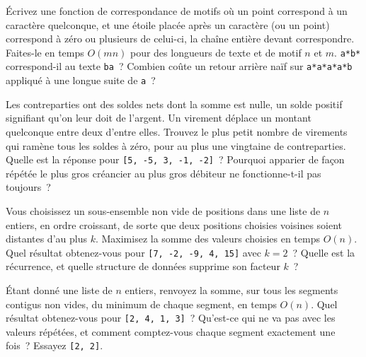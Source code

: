 \begin{question}\label{iq:iv3:algorithms:76}
Écrivez une fonction de correspondance de motifs où un point correspond à un caractère quelconque, et une étoile placée après un caractère (ou un point) correspond à zéro ou plusieurs de celui-ci, la chaîne entière devant correspondre. Faites-le en temps $O(mn)$ pour des longueurs de texte et de motif $n$ et $m$. \texttt{a*b*} correspond-il au texte \texttt{ba}~? Combien coûte un retour arrière naïf sur \texttt{a*a*a*a*b} appliqué à une longue suite de \texttt{a}~?
\end{question}

\begin{question}\label{iq:iv3:algorithms:77}
Les contreparties ont des soldes nets dont la somme est nulle, un solde positif signifiant qu'on leur doit de l'argent. Un virement déplace un montant quelconque entre deux d'entre elles. Trouvez le plus petit nombre de virements qui ramène tous les soldes à zéro, pour au plus une vingtaine de contreparties. Quelle est la réponse pour \texttt{[5, -5, 3, -1, -2]}~? Pourquoi apparier de façon répétée le plus gros créancier au plus gros débiteur ne fonctionne-t-il pas toujours~?
\end{question}

\begin{question}\label{iq:iv3:algorithms:78}
Vous choisissez un sous-ensemble non vide de positions dans une liste de $n$ entiers, en ordre croissant, de sorte que deux positions choisies voisines soient distantes d'au plus $k$. Maximisez la somme des valeurs choisies en temps $O(n)$. Quel résultat obtenez-vous pour \texttt{[7, -2, -9, 4, 15]} avec $k = 2$~? Quelle est la récurrence, et quelle structure de données supprime son facteur $k$~?
\end{question}

\begin{question}\label{iq:iv3:algorithms:79}
Étant donné une liste de $n$ entiers, renvoyez la somme, sur tous les segments contigus non vides, du minimum de chaque segment, en temps $O(n)$. Quel résultat obtenez-vous pour \texttt{[2, 4, 1, 3]}~? Qu'est-ce qui ne va pas avec les valeurs répétées, et comment comptez-vous chaque segment exactement une fois~? Essayez \texttt{[2, 2]}.
\end{question}

